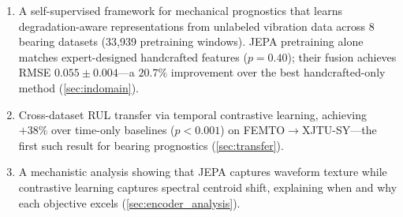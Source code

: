 \begin{enumerate}[nosep]
  \item A self-supervised framework for mechanical prognostics that learns degradation-aware representations from unlabeled vibration data across 8 bearing datasets (33,939 pretraining windows). JEPA pretraining alone matches expert-designed handcrafted features ($p = 0.40$); their fusion achieves RMSE $0.055 \pm 0.004$---a $20.7\%$ improvement over the best handcrafted-only method (\cref{sec:indomain}).

  \item Cross-dataset RUL transfer via temporal contrastive learning, achieving $+38\%$ over time-only baselines ($p < 0.001$) on FEMTO$\to$XJTU-SY---the first such result for bearing prognostics (\cref{sec:transfer}).

  \item A mechanistic analysis showing that JEPA captures waveform texture while contrastive learning captures spectral centroid shift, explaining when and why each objective excels (\cref{sec:encoder_analysis}).

\end{enumerate}
